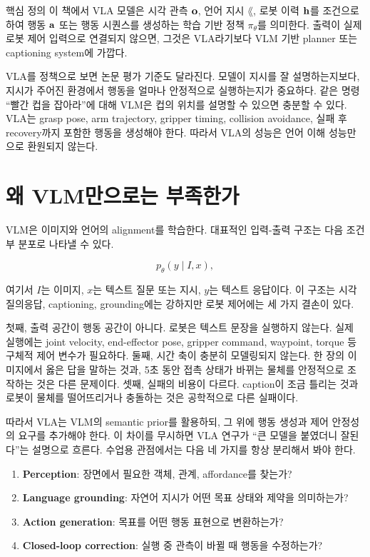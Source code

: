 \begin{conceptbox}{핵심 정의}
이 책에서 VLA 모델은 시각 관측 $\mathbf{o}$, 언어 지시 $\lang$, 로봇 이력 $\mathbf{h}$를 조건으로 하여 행동 $\mathbf{a}$ 또는 행동 시퀀스를 생성하는 학습 기반 정책 $\pi_\theta$를 의미한다. 출력이 실제 로봇 제어 입력으로 연결되지 않으면, 그것은 VLA라기보다 VLM 기반 planner 또는 captioning system에 가깝다.
\end{conceptbox}

VLA를 정책으로 보면 논문 평가 기준도 달라진다. 모델이 지시를 잘 설명하는지보다, 지시가 주어진 환경에서 행동을 얼마나 안정적으로 실행하는지가 중요하다. 같은 명령 ``빨간 컵을 잡아라''에 대해 VLM은 컵의 위치를 설명할 수 있으면 충분할 수 있다. VLA는 grasp pose, arm trajectory, gripper timing, collision avoidance, 실패 후 recovery까지 포함한 행동을 생성해야 한다. 따라서 VLA의 성능은 언어 이해 성능만으로 환원되지 않는다.

\section{왜 VLM만으로는 부족한가}

VLM은 이미지와 언어의 alignment를 학습한다. 대표적인 입력-출력 구조는 다음 조건부 분포로 나타낼 수 있다.

\begin{equation}
  p_\theta(y \mid I, x),
\end{equation}

여기서 $I$는 이미지, $x$는 텍스트 질문 또는 지시, $y$는 텍스트 응답이다. 이 구조는 시각 질의응답, captioning, grounding에는 강하지만 로봇 제어에는 세 가지 결손이 있다.

첫째, 출력 공간이 행동 공간이 아니다. 로봇은 텍스트 문장을 실행하지 않는다. 실제 실행에는 joint velocity, end-effector pose, gripper command, waypoint, torque 등 구체적 제어 변수가 필요하다. 둘째, 시간 축이 충분히 모델링되지 않는다. 한 장의 이미지에서 옳은 답을 말하는 것과, 5초 동안 접촉 상태가 바뀌는 물체를 안정적으로 조작하는 것은 다른 문제이다. 셋째, 실패의 비용이 다르다. caption이 조금 틀리는 것과 로봇이 물체를 떨어뜨리거나 충돌하는 것은 공학적으로 다른 실패이다.

따라서 VLA는 VLM의 semantic prior를 활용하되, 그 위에 행동 생성과 제어 안정성의 요구를 추가해야 한다. 이 차이를 무시하면 VLA 연구가 ``큰 모델을 붙였더니 잘된다''는 설명으로 흐른다. 수업용 관점에서는 다음 네 가지를 항상 분리해서 봐야 한다.

\begin{enumerate}
  \item \textbf{Perception}: 장면에서 필요한 객체, 관계, affordance를 찾는가?
  \item \textbf{Language grounding}: 자연어 지시가 어떤 목표 상태와 제약을 의미하는가?
  \item \textbf{Action generation}: 목표를 어떤 행동 표현으로 변환하는가?
  \item \textbf{Closed-loop correction}: 실행 중 관측이 바뀔 때 행동을 수정하는가?
\end{enumerate}

